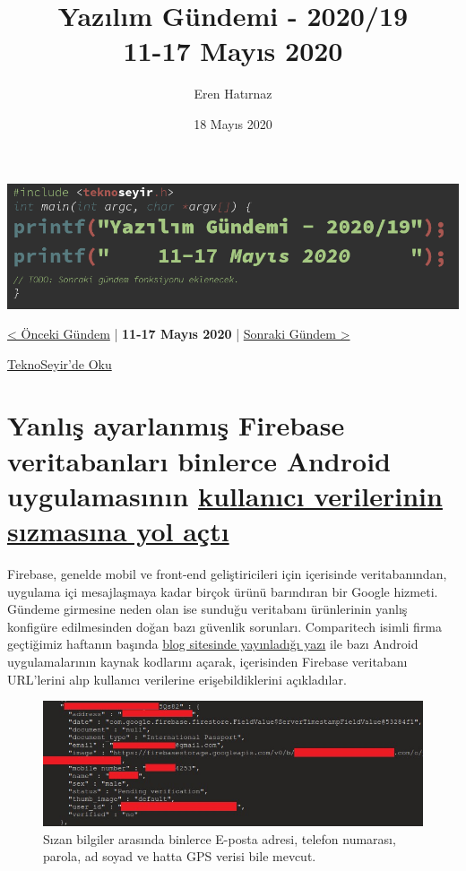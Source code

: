 \documentclass[11pt]{article}
\author{Eren Hatırnaz}
\date{18 Mayıs 2020}
\title{Yazılım Gündemi - 2020/19\\\medskip
\large 11-17 Mayıs 2020}
\begin{document}
\maketitle
\tableofcontents \clearpage\shorthandoff{=}

\begin{center}
\includegraphics[width=.9\linewidth]{gorseller/yazilim-gundemi-banner.png}
\end{center}

\begin{center}
\href{../18/yazilim-gundemi-2020-18.pdf}{< Önceki Gündem} | \textbf{11-17 Mayıs 2020} | \href{../20/yazilim-gundemi-2020-20.pdf}{Sonraki Gündem >}

\href{https://teknoseyir.com/blog/yazilim-gundemi-2020-19}{TeknoSeyir'de Oku}
\end{center}

\section{Yanlış ayarlanmış Firebase veritabanları binlerce Android uygulamasının \href{https://www.theregister.co.uk/2020/05/12/report\_thousands\_of\_android\_apps/}{kullanıcı verilerinin sızmasına yol açtı}}
\label{sec:orgf9e21d7}
Firebase, genelde mobil ve front-end geliştiricileri için içerisinde
veritabanından, uygulama içi mesajlaşmaya kadar birçok ürünü barındıran bir
Google hizmeti. Gündeme girmesine neden olan ise sunduğu veritabanı
ürünlerinin yanlış konfigüre edilmesinden doğan bazı güvenlik sorunları.
Comparitech isimli firma geçtiğimiz haftanın başında \href{https://www.comparitech.com/blog/information-security/firebase-misconfiguration-report/}{blog sitesinde
yayınladığı yazı} ile bazı Android uygulamalarının kaynak kodlarını açarak,
içerisinden Firebase veritabanı URL'lerini alıp kullanıcı verilerine
erişebildiklerini açıkladılar.

\begin{figure}[htbp]
\centering
\includegraphics[width=.9\linewidth]{gorseller/firebase-1.jpg}
\caption{Sızan bilgiler arasında binlerce E-posta adresi, telefon numarası, parola, ad soyad ve hatta GPS verisi bile mevcut.}
\end{figure}
\end{document}
